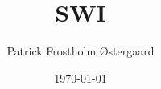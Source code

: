 \documentclass[12pt]{article}
\begin{document}
\title{SWI}
\author{Patrick Frostholm Østergaard}
\date{\today}


\maketitle



\end{document}
